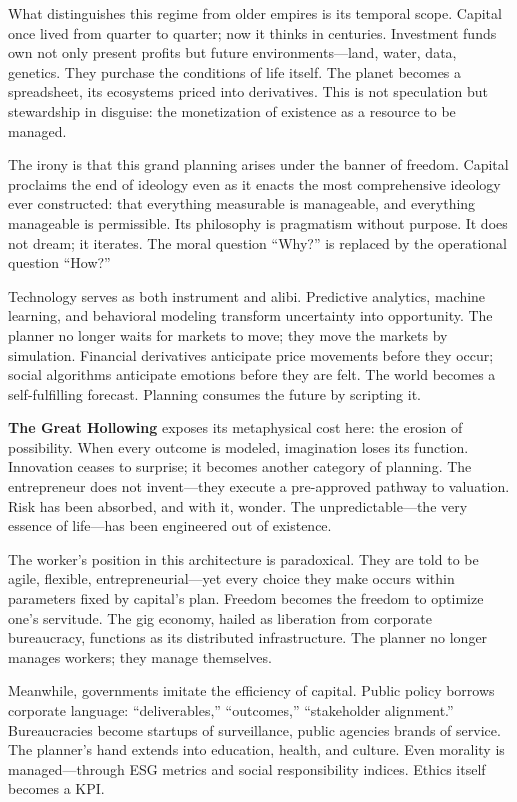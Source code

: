 \documentclass[11pt,twoside]{book}
\begin{document}
What distinguishes this regime from older empires is its temporal scope.  Capital once lived from quarter to quarter; now it thinks in centuries.  Investment funds own not only present profits but future environments—land, water, data, genetics.  They purchase the conditions of life itself.  The planet becomes a spreadsheet, its ecosystems priced into derivatives.  This is not speculation but stewardship in disguise: the monetization of existence as a resource to be managed.

The irony is that this grand planning arises under the banner of freedom.  Capital proclaims the end of ideology even as it enacts the most comprehensive ideology ever constructed: that everything measurable is manageable, and everything manageable is permissible.  Its philosophy is pragmatism without purpose.  It does not dream; it iterates.  The moral question “Why?” is replaced by the operational question “How?”

Technology serves as both instrument and alibi.  Predictive analytics, machine learning, and behavioral modeling transform uncertainty into opportunity.  The planner no longer waits for markets to move; they move the markets by simulation.  Financial derivatives anticipate price movements before they occur; social algorithms anticipate emotions before they are felt.  The world becomes a self-fulfilling forecast.  Planning consumes the future by scripting it.

\textbf{The Great Hollowing} exposes its metaphysical cost here: the erosion of possibility.  When every outcome is modeled, imagination loses its function.  Innovation ceases to surprise; it becomes another category of planning.  The entrepreneur does not invent—they execute a pre-approved pathway to valuation.  Risk has been absorbed, and with it, wonder.  The unpredictable—the very essence of life—has been engineered out of existence.

The worker’s position in this architecture is paradoxical.  They are told to be agile, flexible, entrepreneurial—yet every choice they make occurs within parameters fixed by capital’s plan.  Freedom becomes the freedom to optimize one’s servitude.  The gig economy, hailed as liberation from corporate bureaucracy, functions as its distributed infrastructure.  The planner no longer manages workers; they manage themselves.

Meanwhile, governments imitate the efficiency of capital.  Public policy borrows corporate language: “deliverables,” “outcomes,” “stakeholder alignment.”  Bureaucracies become startups of surveillance, public agencies brands of service.  The planner’s hand extends into education, health, and culture.  Even morality is managed—through ESG metrics and social responsibility indices.  Ethics itself becomes a KPI.
\end{document}
